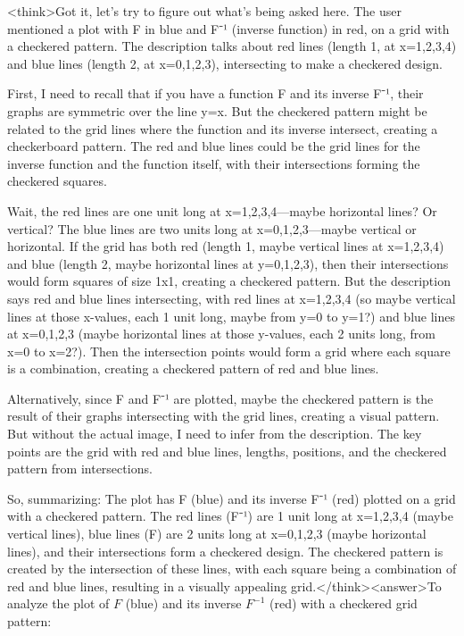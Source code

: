 <think>Got it, let's try to figure out what's being asked here. The user mentioned a plot with F in blue and F⁻¹ (inverse function) in red, on a grid with a checkered pattern. The description talks about red lines (length 1, at x=1,2,3,4) and blue lines (length 2, at x=0,1,2,3), intersecting to make a checkered design. 

First, I need to recall that if you have a function F and its inverse F⁻¹, their graphs are symmetric over the line y=x. But the checkered pattern might be related to the grid lines where the function and its inverse intersect, creating a checkerboard pattern. The red and blue lines could be the grid lines for the inverse function and the function itself, with their intersections forming the checkered squares.

Wait, the red lines are one unit long at x=1,2,3,4—maybe horizontal lines? Or vertical? The blue lines are two units long at x=0,1,2,3—maybe vertical or horizontal. If the grid has both red (length 1, maybe vertical lines at x=1,2,3,4) and blue (length 2, maybe horizontal lines at y=0,1,2,3), then their intersections would form squares of size 1x1, creating a checkered pattern. But the description says red and blue lines intersecting, with red lines at x=1,2,3,4 (so maybe vertical lines at those x-values, each 1 unit long, maybe from y=0 to y=1?) and blue lines at x=0,1,2,3 (maybe horizontal lines at those y-values, each 2 units long, from x=0 to x=2?). Then the intersection points would form a grid where each square is a combination, creating a checkered pattern of red and blue lines.

Alternatively, since F and F⁻¹ are plotted, maybe the checkered pattern is the result of their graphs intersecting with the grid lines, creating a visual pattern. But without the actual image, I need to infer from the description. The key points are the grid with red and blue lines, lengths, positions, and the checkered pattern from intersections.

So, summarizing: The plot has F (blue) and its inverse F⁻¹ (red) plotted on a grid with a checkered pattern. The red lines (F⁻¹) are 1 unit long at x=1,2,3,4 (maybe vertical lines), blue lines (F) are 2 units long at x=0,1,2,3 (maybe horizontal lines), and their intersections form a checkered design. The checkered pattern is created by the intersection of these lines, with each square being a combination of red and blue lines, resulting in a visually appealing grid.</think><answer>To analyze the plot of \( F \) (blue) and its inverse \( F^{-1} \) (red) with a checkered grid pattern:  

